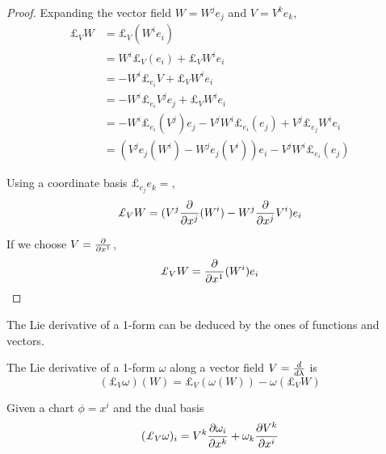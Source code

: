     \begin{proof}
        Expanding the vector field $W = W^j e_j$ and $V = V^k e_k$, 
        \begin{equation*}
        \begin{aligned}
            \pounds_V W & = \pounds_V (W^i e_i) \\ & = W^i \pounds_V (e_i) +  \pounds_V W^i e_i \\ & = - W^i \pounds_{e_i} V + \pounds_V W^i e_i \\ & = - W^i \pounds_{e_i} V^j e_j + \pounds_V W^i e_i \\ & = - W^i \pounds_{e_i} (V^j) e_j - V^j W^i \pounds_{e_i} (e_j) + V^j \pounds_{e_j} W^i e_i \\ & = (V^j e_j (W^i) - W^j e_j (V^i)) e_i - V^j W^i \pounds_{e_i} (e_j)
        \end{aligned}
        \end{equation*}

        Using a coordinate basis $\pounds_{e_j} e_k = $,
        \begin{equation*}
        \begin{aligned}
            \pounds_V W = (V^j \pdv{}{x^j} (W^i) - W^j \pdv{}{x^j} V^i) e_i
        \end{aligned}
        \end{equation*}

        If we choose $V = \frac{\partial}{\partial x^1}$,
        \begin{equation*}
        \begin{aligned}
            \pounds_V W = \pdv{}{x^1} (W^i) e_i
        \end{aligned}
        \end{equation*}
    \end{proof}

    The Lie derivative of a 1-form can be deduced by the ones of functions and vectors.

    \begin{definition}
        The Lie derivative of a 1-form $\omega$ along a vector field $V=\frac{d}{d\lambda}$ is 
        \begin{equation*}
            (\pounds_V \omega ) (W) = \pounds_V (\omega(W)) - \omega(\pounds_V W)
        \end{equation*}
    \end{definition}

    Given a chart $\phi = x^i$ and the dual basis
    \begin{equation*}
        (\pounds_V \omega)_i = V^k \pdv{\omega_i}{x^k} + \omega_k \pdv{V^k}{x^i}
    \end{equation*}


